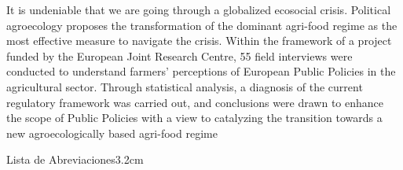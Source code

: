 \documentclass[a4paper, nobind]{templates/ociamthesis}
\begin{document}
\begin{romanpages}

\renewcommand{\abstractsecondtitle}{Abstract}
\begin{abstractsecond}
	\setlength{\baselineskip}{30pt}

It is undeniable that we are going through a globalized ecosocial crisis. Political agroecology proposes the transformation of the dominant agri-food regime as the most effective measure to navigate the crisis. Within the framework of a project funded by the European Joint Research Centre, 55 field interviews were conducted to understand farmers' perceptions of European Public Policies in the agricultural sector. Through statistical analysis, a diagnosis of the current regulatory framework was carried out, and conclusions were drawn to enhance the scope of Public Policies with a view to catalyzing the transition towards a new agroecologically based agri-food regime
\end{abstractsecond}


\renewcommand\listfigurename{Lista de Figuras}   %
\renewcommand\listtablename{Lista de Tablas}


\dominitoc %

\flushbottom

\renewcommand{\contentsname}{Índice}

\tableofcontents

\listoffigures
	\mtcaddchapter

\listoftables
  \mtcaddchapter
\begin{mclistof}{Lista de Abreviaciones}{3.2cm}


\end{mclistof}
\end{romanpages}
\end{document}
